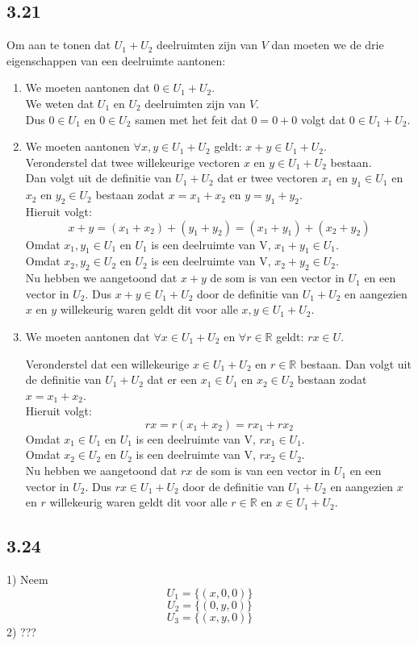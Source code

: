 \documentclass[lineaire_algebra_oplossingen.tex]{subfiles}
\begin{document}
\subsection{3.21}
Om aan te tonen dat $U_1 + U_2$ deelruimten zijn van $V$ dan moeten we de drie eigenschappen van een deelruimte aantonen:
\begin{enumerate}
\item We moeten aantonen dat $0 \in U_1 + U_2$.\\
We weten dat $U_1$ en $U_2$ deelruimten zijn van $V$.\\
Dus $0 \in U_1$ en $0 \in U_2$ samen met het feit dat $0 = 0 + 0$ volgt dat $0 \in U_1 + U_2$.

\item We moeten aantonen $\forall x,y \in U_1 + U_2$ geldt: $x + y \in U_1 + U_2$.\\
Veronderstel dat twee willekeurige vectoren $x$ en $y \in U_1 + U_2$ bestaan.\\
Dan volgt uit de definitie van $U_1 + U_2$ dat er twee vectoren $x_1$ en $y_1 \in U_1$ en $x_2$ en $y_2 \in U_2$ bestaan zodat $x = x_1 + x_2$ en $y = y_1 + y_2$.\\
Hieruit volgt:
$$x + y = (x_1 + x_2) + (y_1 + y_2) = (x_1 + y_1) + (x_2 + y_2)$$
Omdat $x_1, y_1 \in U_1$ en $U_1$ is een deelruimte van V, $x_1 + y_1 \in U_1$.\\
Omdat $x_2, y_2 \in U_2$ en $U_2$ is een deelruimte van V, $x_2 + y_2 \in U_2$.\\
Nu hebben we aangetoond dat $x+y$ de som is van een vector in $U_1$ en een vector in $U_2$. 
Dus $x + y \in U_1 + U_2$ door de definitie van $U_1 + U_2$ en aangezien $x$ en $y$ willekeurig waren geldt dit voor alle $x,y \in U_1 + U_2$.

\item We moeten aantonen dat $\forall x \in U_1 + U_2$ en $\forall r \in \mathbb{R}$ geldt: $rx \in U$.

Veronderstel dat een willekeurige $x \in U_1 + U_2$ en $r \in \mathbb{R}$ bestaan. Dan volgt uit de definitie van $U_1 + U_2$ dat er een $x_1 \in U_1$ en $x_2 \in U_2$ bestaan zodat $x = x_1 + x_2$.\\
Hieruit volgt:
$$rx = r(x_1+x_2) = rx_1+rx_2$$
Omdat $x_1 \in U_1$ en $U_1$ is een deelruimte van V, $rx_1 \in U_1$.\\
Omdat $x_2 \in U_2$ en $U_2$ is een deelruimte van V, $rx_2 \in U_2$.\\
Nu hebben we aangetoond dat $rx$ de som is van een vector in $U_1$ en een vector in $U_2$. 
Dus $rx \in U_1 + U_2$ door de definitie van $U_1 + U_2$ en aangezien $x$ en $r$ willekeurig waren geldt dit voor alle $r \in \mathbb{R}$ en $x \in U_1 + U_2$.
\end{enumerate}
\subsection{3.24}

1) 
Neem \\ 
$$U_1 = \{(x,0,0)\} $$
$$U_2 =  \{ (0,y,0)\} $$
$$U_3 = \{ (x,y,0)\} $$
2) ???
\end{document}
